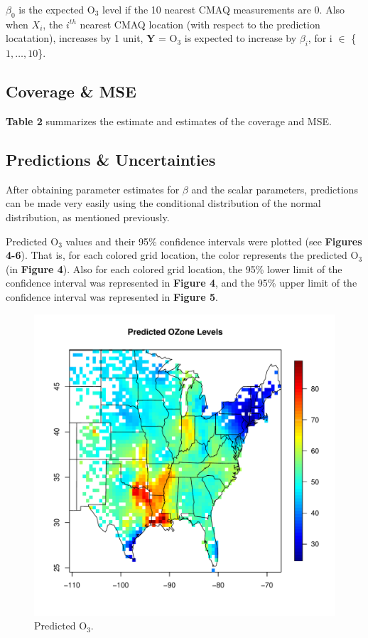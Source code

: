\documentclass{article}                                                   %
\def\wl{\par \vspace{\baselineskip}}                                      %
\def\beginmyfig{\begin{figure}[htbp]\begin{center}}                       %
\def\endmyfig{\end{center}\end{figure}}                                   %
\begin{document}
    
    \wl\noindent
    $\beta_0$ is the expected O$_3$ level if the 10 nearest CMAQ measurements are
    0. Also when $X_i$, the $i^{th}$ nearest CMAQ location (with respect to 
    the prediction locatation), increases by 1 unit, $\bm Y$ = O$_3$ is expected 
    to increase by $\beta_i$, for i $\in$ \{$1,\dots,10$\}.

  \subsection{Coverage \& MSE }
    \textbf{Table 2} summarizes the estimate and estimates of the coverage and MSE.
    

  \subsection{Predictions \& Uncertainties}
    After obtaining parameter estimates for $\beta$ and the scalar parameters,
    predictions can be made very easily using the conditional distribution
    of the normal distribution, as mentioned previously.
    \wl\noindent
    Predicted O$_3$ values and their 95\% confidence intervals were plotted
    (see \textbf{Figures 4-6}). That is, for each colored grid location, the color
    represents the predicted O$_3$ (in \textbf{Figure 4}). Also for each colored
    grid location, the 95\% lower limit of the confidence interval was represented
    in \textbf{Figure 4}, and the 95\% upper limit of the confidence interval
    was represented in \textbf{Figure 5}.

    \beginmyfig
      \includegraphics{raw/center.pdf}
      \caption{Predicted O$_3$.}
    \endmyfig
\end{document}
